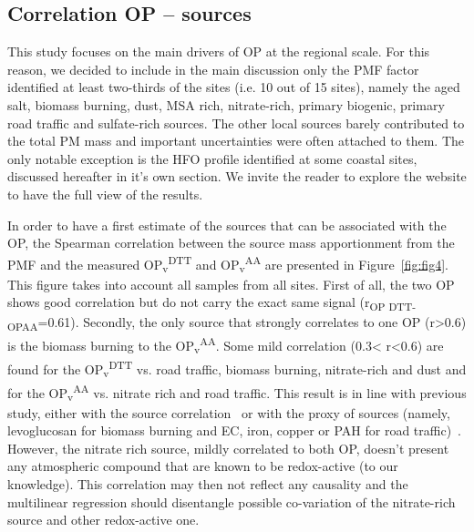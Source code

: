 \documentclass[acp]{copernicus}
\begin{document}
\subsection{Correlation OP -- sources}%
\label{correlation-op-sources}

This study focuses on the main drivers of OP at the regional scale. For
this reason, we decided to include in the main discussion only the PMF
factor identified at least two-thirds of the sites (i.e. 10 out of 15
sites), namely the aged salt, biomass burning, dust, MSA rich,
nitrate-rich, primary biogenic, primary road traffic and sulfate-rich
sources. The other local sources barely contributed to the total PM mass
and important uncertainties were often attached to them. The only
notable exception is the HFO profile identified at some coastal sites,
discussed hereafter in it's own section. We invite the reader to explore
the website to have the full view of the results.

In order to have a first estimate of the sources that can be associated
with the OP, the Spearman correlation between the source mass
apportionment from the PMF and the measured
OP\textsubscript{v}\textsuperscript{DTT} and
OP\textsubscript{v}\textsuperscript{AA} are presented in
Figure~\ref{fig:fig4}. This figure takes
into account all samples from all sites. First of all, the two OP shows
good correlation but do not carry the exact same signal
(r\textsubscript{OP DTT-OPAA}=0.61). Secondly, the only source that
strongly correlates to one OP (r\textgreater0.6) is the biomass burning
to the OP\textsubscript{v}\textsuperscript{AA}. Some mild correlation
(0.3\textless{} r\textless0.6) are found for the
OP\textsubscript{v}\textsuperscript{DTT} vs. road traffic, biomass
burning, nitrate-rich and dust and for the
OP\textsubscript{v}\textsuperscript{AA} vs. nitrate rich and road
traffic. This result is in line with previous study, either with the
source correlation~\citep{weberApportionment2018} or with the proxy of sources
(namely, levoglucosan for biomass burning and EC, iron, copper or PAH
for road
traffic)~\citep{calasComparison2018,calasSeasonal2019,charrierDithiothreitol2012,choRedox2005,huRedox2008,janssenAssociations2015,kunzliComparison2006,ntziachristosRelationship2007,pietrograndeChemical2018,vermaRedox2009,vermaReactive2014,borlazaOxidative2018}.
However, the nitrate rich source, mildly correlated
to both OP, doesn't present any atmospheric compound that are known to
be redox-active (to our knowledge). This correlation may then not
reflect any causality and the multilinear regression should disentangle
possible co-variation of the nitrate-rich source and other redox-active
one.
\end{document}

